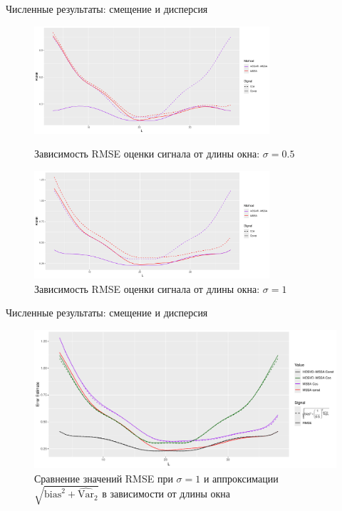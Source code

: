 \documentclass[pdf, unicode, 9pt, notheorems, handout]{beamer}
\begin{document}
    \begin{frame}{Численные результаты: смещение и дисперсия}
        \begin{figure}
            \begin{minipage}[c]{0.8\textwidth}
                \includegraphics[height=4cm]{./img/approx_sep_small_noise}
            \end{minipage}\hfill
            \begin{minipage}[c]{0.18\textwidth}
                \caption{Зависимость RMSE оценки сигнала от длины окна: $\sigma = 0.5$}
            \end{minipage}
            \begin{minipage}[c]{0.8\textwidth}
                \includegraphics[height=4cm]{./img/approx_sep_large_noise}
            \end{minipage}\hfill
            \begin{minipage}[c]{0.18\textwidth}
                \caption{Зависимость RMSE оценки сигнала от длины окна: $\sigma = 1$}
            \end{minipage}
        \end{figure}
    \end{frame}
    \begin{frame}{Численные результаты: смещение и дисперсия}
        \begin{figure}
            \centering
            \includegraphics[width=\linewidth]{./img/approx_sep_errors}
            \caption{Сравнение значений RMSE при $\sigma=1$ и аппроксимации 
                $\sqrt{\mathrm{bias}^2 + \widehat{\mathrm{Var}}_2}$ в зависимости от длины окна}
        \end{figure}
    \end{frame}
    
\end{document}

